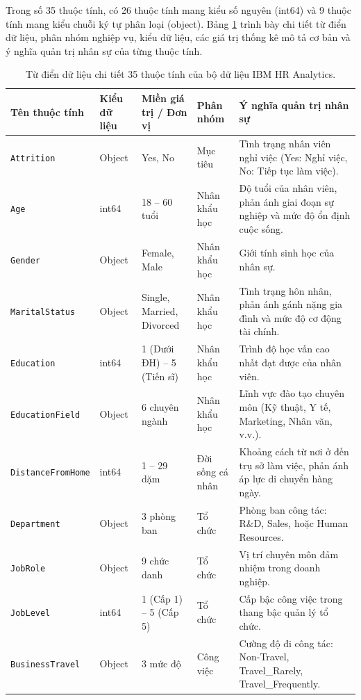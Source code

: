 \documentclass[12pt,a4paper]{article}
\begin{document}
Trong số 35 thuộc tính, có 26 thuộc tính mang kiểu số nguyên (int64) và 9 thuộc tính mang kiểu chuỗi ký tự phân loại (object). Bảng \ref{tab:data_dict} trình bày chi tiết từ điển dữ liệu, phân nhóm nghiệp vụ, kiểu dữ liệu, các giá trị thống kê mô tả cơ bản và ý nghĩa quản trị nhân sự của từng thuộc tính.

\begin{table}[H]
\centering
\caption{Từ điển dữ liệu chi tiết 35 thuộc tính của bộ dữ liệu IBM HR Analytics.}
\label{tab:data_dict}
\tiny
\renewcommand{\arraystretch}{1.15}
\begin{tabular}{|l|l|l|l|p{6.5cm}|}
\hline
\textbf{Tên thuộc tính} & \textbf{Kiểu dữ liệu} & \textbf{Miền giá trị / Đơn vị} & \textbf{Phân nhóm} & \textbf{Ý nghĩa quản trị nhân sự} \\
\hline
\texttt{Attrition} & Object & Yes, No & Mục tiêu & Tình trạng nhân viên nghỉ việc (Yes: Nghỉ việc, No: Tiếp tục làm việc). \\
\hline
\texttt{Age} & int64 & 18 -- 60 tuổi & Nhân khẩu học & Độ tuổi của nhân viên, phản ánh giai đoạn sự nghiệp và mức độ ổn định cuộc sống. \\
\hline
\texttt{Gender} & Object & Female, Male & Nhân khẩu học & Giới tính sinh học của nhân sự. \\
\hline
\texttt{MaritalStatus} & Object & Single, Married, Divorced & Nhân khẩu học & Tình trạng hôn nhân, phản ánh gánh nặng gia đình và mức độ cơ động tài chính. \\
\hline
\texttt{Education} & int64 & 1 (Dưới ĐH) -- 5 (Tiến sĩ) & Nhân khẩu học & Trình độ học vấn cao nhất đạt được của nhân viên. \\
\hline
\texttt{EducationField} & Object & 6 chuyên ngành & Nhân khẩu học & Lĩnh vực đào tạo chuyên môn (Kỹ thuật, Y tế, Marketing, Nhân văn, v.v.). \\
\hline
\texttt{DistanceFromHome} & int64 & 1 -- 29 dặm & Đời sống cá nhân & Khoảng cách từ nơi ở đến trụ sở làm việc, phản ánh áp lực di chuyển hàng ngày. \\
\hline
\texttt{Department} & Object & 3 phòng ban & Tổ chức & Phòng ban công tác: R\&D, Sales, hoặc Human Resources. \\
\hline
\texttt{JobRole} & Object & 9 chức danh & Tổ chức & Vị trí chuyên môn đảm nhiệm trong doanh nghiệp. \\
\hline
\texttt{JobLevel} & int64 & 1 (Cấp 1) -- 5 (Cấp 5) & Tổ chức & Cấp bậc công việc trong thang bậc quản lý tổ chức. \\
\hline
\texttt{BusinessTravel} & Object & 3 mức độ & Công việc & Cường độ đi công tác: Non-Travel, Travel\_Rarely, Travel\_Frequently. \\

\end{tabular}
\end{table}
\end{document}
